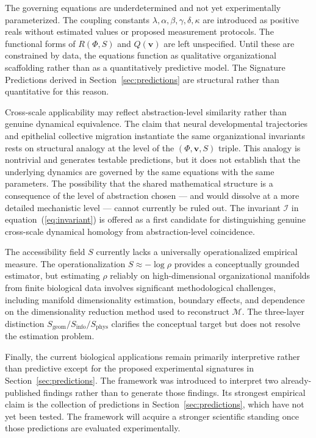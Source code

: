 \documentclass[11pt,a4paper]{article}
\theoremstyle{plain}
\theoremstyle{definition}
\begin{document}
The governing equations are underdetermined and not yet experimentally parameterized.
The coupling constants $\lambda, \alpha, \beta, \gamma, \delta, \kappa$ are introduced
as positive reals without estimated values or proposed measurement protocols. The
functional forms of $R(\Phi, S)$ and $Q(\mathbf{v})$ are left unspecified. Until these
are constrained by data, the equations function as qualitative organizational scaffolding
rather than as a quantitatively predictive model. The Signature Predictions derived in
Section~\ref{sec:predictions} are structural rather than quantitative for this reason.

Cross-scale applicability may reflect abstraction-level similarity rather than genuine
dynamical equivalence. The claim that neural developmental trajectories and epithelial
collective migration instantiate the same organizational invariants rests on structural
analogy at the level of the $(\Phi, \mathbf{v}, S)$ triple. This analogy is nontrivial
and generates testable predictions, but it does not establish that the underlying
dynamics are governed by the same equations with the same parameters. The possibility
that the shared mathematical structure is a consequence of the level of abstraction
chosen --- and would dissolve at a more detailed mechanistic level --- cannot currently
be ruled out. The invariant $\mathcal{I}$ in equation~(\ref{eq:invariant}) is offered
as a first candidate for distinguishing genuine cross-scale dynamical homology from
abstraction-level coincidence.

The accessibility field $S$ currently lacks a universally operationalized empirical
measure. The operationalization $S \approx -\log\rho$ provides a conceptually grounded
estimator, but estimating $\rho$ reliably on high-dimensional organizational manifolds
from finite biological data involves significant methodological challenges, including
manifold dimensionality estimation, boundary effects, and dependence on the dimensionality
reduction method used to reconstruct $\mathcal{M}$. The three-layer distinction
$S_{\mathrm{geom}}/S_{\mathrm{info}}/S_{\mathrm{phys}}$ clarifies the conceptual
target but does not resolve the estimation problem.

Finally, the current biological applications remain primarily interpretive rather than
predictive except for the proposed experimental signatures in Section~\ref{sec:predictions}.
The framework was introduced to interpret two already-published findings rather than to
generate those findings. Its strongest empirical claim is the collection of predictions
in Section~\ref{sec:predictions}, which have not yet been tested. The framework will
acquire a stronger scientific standing once those predictions are evaluated experimentally.
\end{document}
